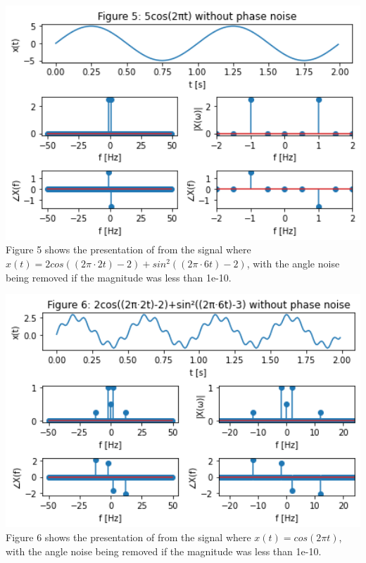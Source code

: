 \documentclass[12pt,a4paper]{article}
\begin{document}
\includegraphics[width=1\textwidth]{Figure5.png}\\
Figure 5 shows the presentation of from the signal where $x(t) =2cos((2 \pi\cdot 2 t)-2)+sin^2((2 \pi\cdot 6 t)-2)$, with the angle noise being removed if the magnitude was less than 1e-10.

\includegraphics[width=1\textwidth]{Figure6.png}\\
Figure 6 shows the presentation of from the signal where $x(t)=cos(2 \pi t)$, with the angle noise being removed if the magnitude was less than 1e-10.
\end{document}
